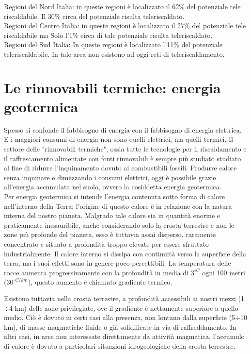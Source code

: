 \documentclass[laurea,oneside,11pt]{USiena_tesiLM}
\begin{document}
Regioni del Nord Italia: in queste regioni è localizzato il 62\% del potenziale tele riscaldabile. Il 30\% circa del potenziale risulta teleriscaldato. \\

Regioni del Centro Italia: in queste regioni è localizzato il 27\% del potenziale tele riscaldabile ma Solo l'1\% circa di tale potenziale risulta teleriscaldato. \\

Regioni del Sud Italia: In queste regioni è localizzato l'11\% del potenziale teleriscaldabile. In tale area non esistono ad oggi reti di teleriscaldamento.

\section{Le rinnovabili termiche: energia geotermica}
Spesso si confonde il fabbisogno di energia con il fabbisogno di energia elettrica. E i maggiori consumi di energia non sono quelli elettrici, ma quelli termici. Il settore delle "rinnovabili termiche", ossia tutte le tecnologie per il riscaldamento e il raffrescamento alimentate con fonti rinnovabili è sempre più studiato studiato al fine di ridurre l'inquinamento dovuto ai combustibili fossili.
Produrre calore senza inquinare e dimezzando i consumi elettrici, oggi è possibile grazie all'energia accumulata nel suolo, ovvero la cosiddetta energia geotermica.\\

Per energia geotermica si intende l'energia contenuta sotto forma  di calore nell'interno della Terra; l'origine di questo calore è in relazione con la natura interna del nostro pianeta. Malgrado tale calore sia in quantità enorme e praticamente inesauribile, anche considerando solo la crosta terrestre e non le zone più profonde del pianeta, esso è tuttavia assai disperso, raramente concentrato e situato a profondità troppo elevate per essere sfruttato industrialmente. Il calore interno si dissipa con continuità verso la superficie della terra, ma i suoi effetti sono in genere poco percettibili. La temperatura delle rocce aumenta progressivamente con la profondità in media di $3 ^{\circ C}$ ogni 100 metri ($30 ^{\circ C/km}$), questo aumento è chiamato gradiente termico.

Esistono tuttavia nella crosta terrestre, a profondità accessibili ai nostri mezzi (1$\div$4 km) delle zone privilegiate, ove il gradiente è nettamente superiore a quello medio. Ciò è dovuto in certi casi alla presenza, non lontano dalla superficie (5$\div$10 km), di masse magmatiche fluide o già solidificate in via di raffreddamento. In altri casi, in aree non interessate direttamente da attività magmatica, l'accumulo di calore è dovuto a particolari situazioni idrogeologiche della crosta terrestre.
\end{document}

